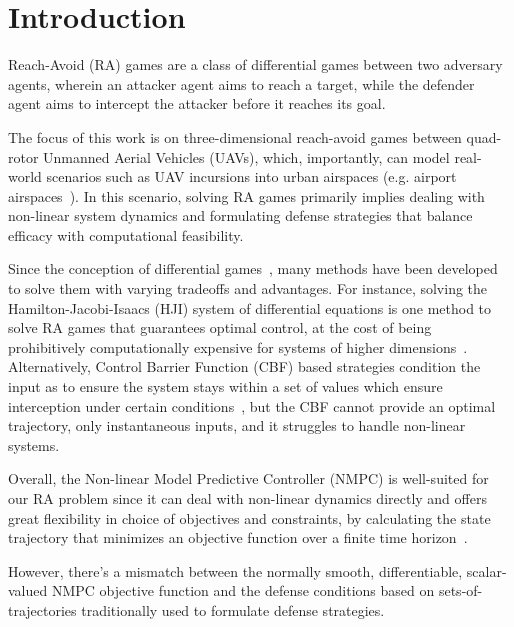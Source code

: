 \documentclass[letterpaper,10pt,conference]{ieeeconf}
\begin{document}
\section{Introduction}
Reach-Avoid (RA) games are a class of differential games between two adversary agents, wherein an attacker agent aims to reach a target, while the defender agent aims to intercept the attacker before it reaches its goal.

The focus of this work is on three-dimensional reach-avoid games between quad-rotor Unmanned Aerial Vehicles (UAVs), which, importantly, can model real-world scenarios such as UAV incursions into urban airspaces (e.g. airport airspaces~\cite{newsDronesAirports}). 
%
In this scenario, solving RA games primarily implies dealing with non-linear system dynamics and formulating defense strategies that balance efficacy with computational feasibility.


Since the conception of differential games~\cite{isaacs1999differential_seminal}, many methods have been developed to solve them with varying tradeoffs and advantages.
%
For instance, solving the Hamilton-Jacobi-Isaacs (HJI) system of differential equations is one method to solve RA games that guarantees optimal control, at the cost of being prohibitively computationally expensive for systems of higher dimensions~\cite{zhou2016cooperative,Bui2025ReachAvoidDG,hayoun2017guaranteeing}.
%
Alternatively, Control Barrier Function (CBF) based strategies condition the input as to ensure the system stays within a set of values which ensure interception under certain conditions~\cite{Bui2025ReachAvoidDG,chen2025cooperative,AliMPCCBF,davydov2021pursuer}, but the CBF cannot provide an optimal trajectory, only instantaneous inputs, and it struggles to handle non-linear systems.

Overall, the Non-linear Model Predictive Controller (NMPC) is well-suited for our RA problem since it can deal with non-linear dynamics directly and offers great flexibility in choice of objectives and constraints, by calculating the state trajectory that minimizes an objective function over a finite time horizon~\cite{DoraN,}.

However, there's a mismatch between the normally smooth, differentiable, scalar-valued NMPC objective function and the defense conditions based on sets-of-trajectories traditionally used to formulate defense strategies.
\end{document}
